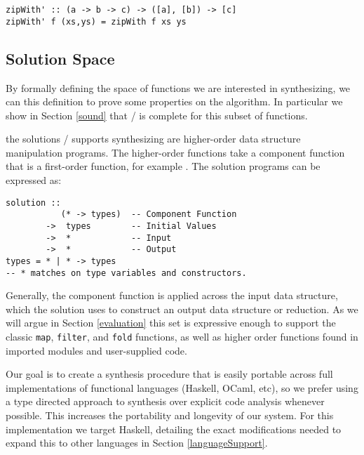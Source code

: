 \begin{lstlisting}
zipWith' :: (a -> b -> c) -> ([a], [b]) -> [c]
zipWith' f (xs,ys) = zipWith f xs ys
\end{lstlisting}

\subsection{Solution Space}\label{solnSpace}
By formally defining the space of functions we are interested in synthesizing, we can this definition to prove some properties on the algorithm.
In particular we show in Section \ref{sound} that \ourTool/ is complete for this subset of functions.

the solutions \ourTool/ supports synthesizing are higher-order data structure manipulation programs.
The higher-order functions take a component function that is a first-order function, for example \codeinline{(+)}.
The solution programs can be expressed as:

\begin{lstlisting}
solution ::
           (* -> types)  -- Component Function
        ->  types        -- Initial Values
        ->  *            -- Input
        ->  *            -- Output
types = * | * -> types
-- * matches on type variables and constructors.
\end{lstlisting}

Generally, the component function is applied across the \textsf{input} data structure, which the \textsf{solution} uses to construct an \textsf{output} data structure or reduction. As we will argue in Section \ref{evaluation} this set is expressive enough to support the classic \texttt{map}, \texttt{filter}, and \texttt{fold} functions, as well as higher order functions found in imported modules and user-supplied code.

Our goal is to create a synthesis procedure that is easily portable across full implementations of functional languages (Haskell, OCaml, etc), so we prefer using a type directed approach to synthesis over explicit code analysis whenever possible. This increases the portability and longevity of our system. For this implementation we target Haskell, detailing the exact modifications needed to expand this to other languages in Section \ref{languageSupport}.  



